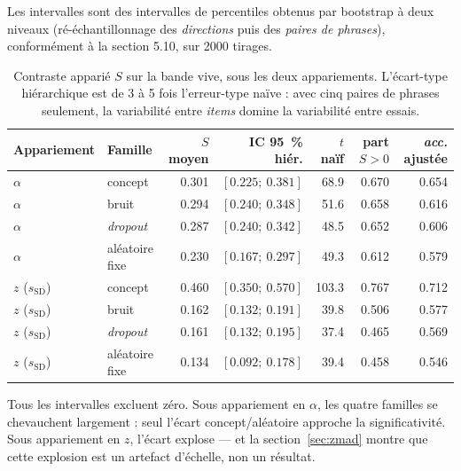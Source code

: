 \documentclass[11pt,a4paper]{article}
\newcommand{\ssd}{s_{\mathrm{SD}}}
\begin{document}
Les intervalles sont des intervalles de percentiles obtenus par bootstrap à deux niveaux
(ré-échantillonnage des \emph{directions} puis des \emph{paires de phrases}), conformément
à la section 5.10, sur \num{2000} tirages.

\begin{table}[h]
\centering
\caption{Contraste apparié $S$ sur la bande vive, sous les deux appariements.
L'écart-type hiérarchique est de 3 à 5 fois l'erreur-type naïve : avec cinq paires de
phrases seulement, la variabilité entre \emph{items} domine la variabilité entre essais.}
\label{tab:S}
\begin{tabular}{llrrrrr}
\toprule
Appariement & Famille & $S$ moyen & IC \SI{95}{\percent} hiér. & $t$ naïf & part $S>0$ & \emph{acc.} ajustée \\
\midrule
$\alpha$ & concept        & \num{0.301} & $[\num{0.225};\ \num{0.381}]$ & \num{68.9} & \num{0.670} & \num{0.654} \\
$\alpha$ & bruit          & \num{0.294} & $[\num{0.240};\ \num{0.348}]$ & \num{51.6} & \num{0.658} & \num{0.616} \\
$\alpha$ & \emph{dropout} & \num{0.287} & $[\num{0.240};\ \num{0.342}]$ & \num{48.5} & \num{0.652} & \num{0.606} \\
$\alpha$ & aléatoire fixe & \num{0.230} & $[\num{0.167};\ \num{0.297}]$ & \num{49.3} & \num{0.612} & \num{0.579} \\
\midrule
$z$ ($\ssd$) & concept        & \num{0.460} & $[\num{0.350};\ \num{0.570}]$ & \num{103.3} & \num{0.767} & \num{0.712} \\
$z$ ($\ssd$) & bruit          & \num{0.162} & $[\num{0.132};\ \num{0.191}]$ & \num{39.8}  & \num{0.506} & \num{0.577} \\
$z$ ($\ssd$) & \emph{dropout} & \num{0.161} & $[\num{0.132};\ \num{0.195}]$ & \num{37.4}  & \num{0.465} & \num{0.569} \\
$z$ ($\ssd$) & aléatoire fixe & \num{0.134} & $[\num{0.092};\ \num{0.178}]$ & \num{39.4}  & \num{0.458} & \num{0.546} \\
\bottomrule
\end{tabular}
\end{table}

\noindent
Tous les intervalles excluent zéro. Sous appariement en $\alpha$, les quatre familles se
chevauchent largement : seul l'écart concept/aléatoire approche la significativité. Sous
appariement en $z$, l'écart explose --- et la section~\ref{sec:zmad} montre que cette
explosion est un artefact d'échelle, non un résultat.
\end{document}
